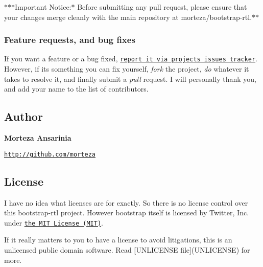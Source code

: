 $\ast$$\ast$$\ast$\+Important Notice\+:$\ast$ Before submitting any pull request, please ensure that your changes merge cleanly with the main repository at morteza/bootstrap-\/rtl.$\ast$$\ast$

\subsubsection*{Feature requests, and bug fixes}

If you want a feature or a bug fixed, \href{https://github.com/morteza/bootstrap-rtl/issues}{\tt report it via project\textquotesingle{}s issues tracker}. However, if it\textquotesingle{}s something you can fix yourself, {\itshape fork} the project, {\itshape do} whatever it takes to resolve it, and finally submit a {\itshape pull} request. I will personally thank you, and add your name to the list of contributors.

\subsection*{Author}

{\bfseries Morteza Ansarinia}


\begin{DoxyItemize}
\item \href{http://github.com/morteza}{\tt http\+://github.\+com/morteza}
\end{DoxyItemize}

\subsection*{License}

I have no idea what licenses are for exactly. So there is no license control over this bootstrap-\/rtl project. However bootstrap itself is licensed by Twitter, Inc. under \href{LICENSE.bootstrap}{\tt the M\+IT License (M\+IT)}.

If it really matters to you to have a license to avoid litigations, this is an unlicensed public domain software. Read \mbox{[}U\+N\+L\+I\+C\+E\+N\+SE file\mbox{]}(U\+N\+L\+I\+C\+E\+N\+SE) for more. 